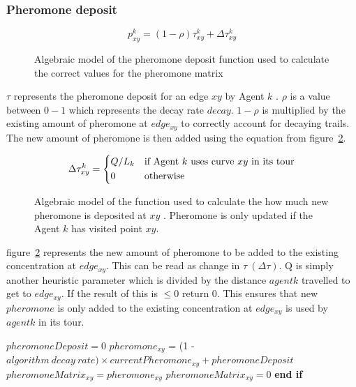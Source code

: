 \subsubsection{Pheromone deposit}


\label{sssec:pherodepo}
\begin{figure}[H]
\Large
\begin{equation}
p_{xy}^{k} = (1 - \rho)\tau_{xy}^{k} + \Delta\tau_{xy}^{k}
\end{equation}

\caption{Algebraic model of the pheromone deposit function used to calculate the correct values for the pheromone matrix
\label{fig:pheromonefunc}
\cite{pheromone:image}}
\end{figure}

\noindent
$\tau$ represents the pheromone deposit for an edge $xy$ by Agent $k$ \cite{tjung:aco:blog}. $\rho$ is a value between $0-1$ which represents the decay rate $decay$. $1 - \rho$ is multiplied by the existing amount of pheromone at $edge_{xy}$ to correctly account for decaying trails. The new amount of pheromone is then added using the equation from figure~\ref{fig:newpheromonefunc}. 


\begin{figure}[H]
\Large
\begin{equation}
\Delta\tau_{xy}^{k} = 
\begin{dcases*}
Q/L_k & \text{if Agent $k$ uses curve $xy$ in its tour}\\
0 & \text{otherwise}
\end{dcases*}
\end{equation}

\caption{Algebraic model of the function used to calculate the how much new pheromone is deposited at $xy$
\label{fig:newpheromonefunc}
\cite{new:pheromone:image}. Pheromone is only updated if the Agent $k$ has visited point $xy$.}

\end{figure}

\noindent
figure~\ref{fig:newpheromonefunc} represents the new amount of pheromone to be added to the existing concentration at $edge_{xy}$. This can be read as change in $\tau\ (\Delta \tau)$. Q is simply another heuristic parameter which is divided by the distance $agent k$ travelled to get to $edge_{xy}$. If the result of this is $\leq 0$ return 0. This ensures that new $pheromone$ is only added to the existing concentration at $edge_{xy}$ is used by $agent k$ in its tour.

\begin{algorithm}[H]
\caption{Pseudo-code for Pheromone function - figures~\ref{fig:pheromonefunc}, \ref{fig:newpheromonefunc}}
\label{aco:pseudo:pherofunc}
\begin{algorithmic}[1]
\State $pheromoneDeposit = 0$
\EndIf
\State $pheromone_{xy}$ = (1 - $algorithm\ decay\ rate) \times currentPheromone_{xy} + pheromoneDeposit$
\State $pheromoneMatrix_{xy} = pheromone_{xy}$
\Else
\State $pheromoneMatrix_{xy} = 0$
\EndIf \State \textbf{end if}
\end{algorithmic}
\end{algorithm}

